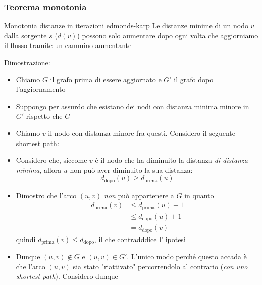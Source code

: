 \subsubsection{Teorema monotonia}
\begin{teorema}{Monotonia distanze in iterazioni edmonds-karp}
	Le distanze minime di un nodo $ v $ dalla sorgente $ s $ ($ d\left(v\right) $) possono solo aumentare dopo ogni volta che aggiorniamo il flusso tramite un cammino aumentante
\end{teorema}\label{monotonia}
Dimostrazione:
\begin{itemize}
	\item Chiamo $ G $ il grafo prima di essere aggiornato e $ G' $ il grafo dopo l'aggiornamento
	\item Suppongo per assurdo che esistano dei nodi con distanza minima minore in $ G' $ rispetto che $ G $
	\item Chiamo $ v $ il nodo con distanza minore fra questi. Considero il seguente shortest path:
	      \vskip3mm
	      \begin{center}
	      \end{center}
	\item Considero che, siccome $ v $ è il nodo che ha diminuito la distanza \textit{di distanza minima}, allora $ u $ non può aver diminuito la sua distanza:
	      \[
		      d_{\text{dopo}} \left(u\right) \geq d_{\text{prima}} \left(u\right)
	      \]
	\item Dimostro che l'arco $ \left(u,v\right) $ \textit{non} può appartenere a $ G $ in quanto
	      \begin{align*}
		      d_{\text{prima}}\left(v\right) & \le d_{\text{prima}}\left(u\right) + 1 \\
		                                     & \le d_{\text{dopo}} \left(u\right) + 1 \\
		                                     & = d_{\text{dopo}} \left(v\right)
	      \end{align*}
	      quindi $  d_{\text{prima}}\left(v\right) \le d_{\text{dopo}} $, il che contradddice l' ipotesi
	\item Dunque $ \left(u,v\right) \not \in G $ e $ \left(u,v\right) \in G' $. L'unico modo perché questo accada è che l'arco $ \left(u,v\right) $ sia stato "riattivato" percorrendolo al contrario (\textit{con uno shortest path}). Considero dunque

\end{itemize}
